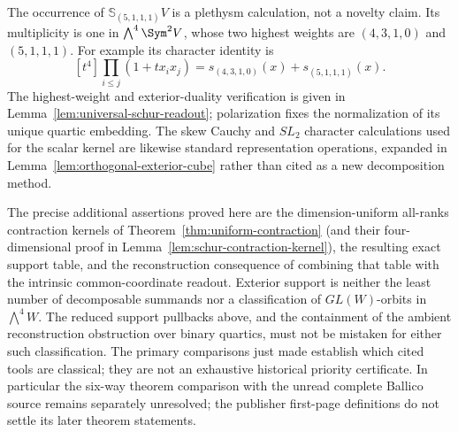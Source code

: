 The occurrence of \(\mathbb S_{(5,1,1,1)}V\) is a plethysm
calculation, not a novelty claim.  Its multiplicity is one in
\(\bigwedge^4\Sym^2V\), whose two highest weights are
\((4,3,1,0)\) and \((5,1,1,1)\).  For example its character
identity is
\[
 [t^4]\prod_{i\le j}(1+t x_ix_j)
       =s_{(4,3,1,0)}(x)+s_{(5,1,1,1)}(x).
\]
The highest-weight and exterior-duality verification is given in
Lemma~\ref{lem:universal-schur-readout}; polarization fixes the
normalization of its unique quartic embedding.  The skew Cauchy and
\(SL_2\) character calculations used for the scalar kernel are likewise
standard representation operations, expanded in
Lemma~\ref{lem:orthogonal-exterior-cube} rather than cited as a
new decomposition method.

The precise additional assertions proved here are the dimension-uniform all-ranks
contraction kernels of Theorem~\ref{thm:uniform-contraction}
(and their four-dimensional proof in
Lemma~\ref{lem:schur-contraction-kernel}),
the resulting exact support table, and the reconstruction consequence
of combining that table with the intrinsic common-coordinate
readout.  Exterior support is neither the least number of decomposable
summands nor a classification of \(GL(W)\)-orbits in
\(\bigwedge^4W\).  The reduced support pullbacks above, and the
containment of the ambient reconstruction obstruction over binary
quartics, must not be mistaken for either such classification.
The primary comparisons just made establish which cited tools are
classical; they are not an exhaustive historical priority certificate.
In particular the six-way theorem comparison with the unread
complete Ballico source \cite{Ballico93} remains separately
unresolved; the publisher first-page definitions do not settle its
later theorem statements.
